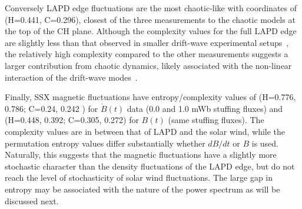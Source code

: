 \documentclass[aps,prx,twocolumn,secnumarabic,nobalancelastpage,amsmath,amssymb,
nofootinbib]{revtex4-1}
\begin{document}
Conversely LAPD edge fluctuations are the most chaotic-like with coordinates of (H=0.441, C=0.296), closest of the three measurements to the chaotic models at the top of the CH plane. Although the complexity values for the full LAPD edge are slightly less than that observed in smaller drift-wave experimental setups~\cite{maggs2013}, the relatively high complexity compared to the other measurements suggests a larger contribution from chaotic dynamics, likely associated with the non-linear interaction of the drift-wave modes~\cite{maggs2012}. 

Finally, SSX magnetic fluctuations have entropy/complexity values of (H=0.776, 0.786; C=0.24, 0.242 ) for $\dot{B}(t)$ data (0.0 and 1.0 mWb stuffing fluxes) and (H=0.448, 0.392; C=0.305, 0.272) for $B(t)$ (same stuffing fluxes). The complexity values are in between that of LAPD and the solar wind, while the permutation entropy values differ substantially whether $dB/dt$ or $B$ is used. Naturally, this suggests that the magnetic fluctuations have a slightly more stochastic character than the density fluctuations of the LAPD edge, but do not reach the level of stochasticity of solar wind fluctuations. The large gap in entropy may be associated with the nature of the power spectrum as will be discussed next.
\end{document}
